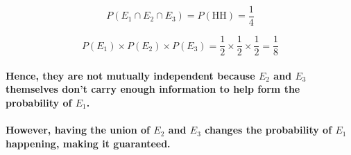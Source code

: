 \documentclass[
]{article}
\begin{document}
\[
P(E_1 \cap E_2 \cap E_3) = P(\text{HH}) = \frac{1}{4}
\]

\[
P(E_1) \times P(E_2) \times P(E_3) = \frac{1}{2} \times \frac{1}{2} \times \frac{1}{2} = \frac{1}{8}
\]

\paragraph{\texorpdfstring{Hence, they are not mutually independent
because \(E_2\) and \(E_3\) themselves don't carry enough information to
help form the probability of
\(E_1\).}{Hence, they are not mutually independent because E\_2 and E\_3 themselves don't carry enough information to help form the probability of E\_1.}}\label{hence-they-are-not-mutually-independent-because-e_2-and-e_3-themselves-dont-carry-enough-information-to-help-form-the-probability-of-e_1.}

\paragraph{\texorpdfstring{However, having the union of \(E_2\) and
\(E_3\) changes the probability of \(E_1\) happening, making it
guaranteed.}{However, having the union of E\_2 and E\_3 changes the probability of E\_1 happening, making it guaranteed.}}\label{however-having-the-union-of-e_2-and-e_3-changes-the-probability-of-e_1-happening-making-it-guaranteed.}
\end{document}

